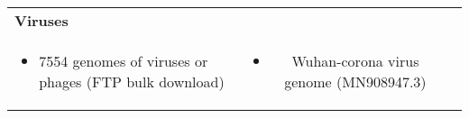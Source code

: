 {\begin{minipage}[t]{786mm}
\begin{center}
\begin{tabular}{lcl}
\hspace{-5mm} \linespread{1.2}\fontsize{36}{20}\selectfont \textbf{Viruses} &  & \\
 \hspace{-0mm}\begin{minipage}{240mm} \begin{itemize} \item 7554 genomes of viruses or phages (FTP bulk download)\end{itemize}\end{minipage}& \begin{minipage}{240mm} \begin{itemize} \item Wuhan-corona virus genome (MN908947.3) \end{itemize}\end{minipage}& \\
\end{tabular}\end{center}
\vspace{5mm}
\end{minipage} }
